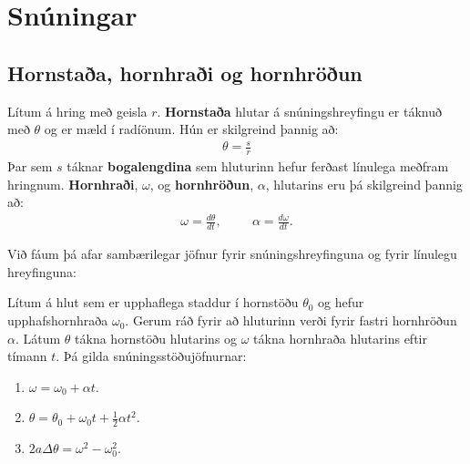 
\chapter{Snúningar}

\section{Hornstaða, hornhraði og hornhröðun}


\begin{tcolorbox}
\begin{definition} \label{def:hornstada}
Lítum á hring með geisla $r$. \textbf{Hornstaða} hlutar á snúningshreyfingu er táknuð með $\theta$ og er mæld í radíönum. Hún er skilgreind þannig að:
\begin{align*}
    \theta = \frac{s}{r}
\end{align*}
Þar sem $s$ táknar \textbf{bogalengdina} sem hluturinn hefur ferðast línulega meðfram hringnum. \textbf{Hornhraði}, $\omega$, og \textbf{hornhröðun}, $\alpha$, hlutarins eru þá skilgreind þannig að:
\begin{align*}
    \omega = \frac{d\theta}{dt}, \hspace{1cm} \alpha = \frac{d\omega}{dt}.
\end{align*}
\end{definition}
\end{tcolorbox}

Við fáum þá afar sambærilegar jöfnur fyrir snúningshreyfinguna og fyrir línulegu hreyfinguna:


\begin{tcolorbox}
\begin{theorem}
Lítum á hlut sem er upphaflega staddur í hornstöðu $\theta_0$ og hefur upphafshornhraða $\omega_0$. Gerum ráð fyrir að hluturinn verði fyrir fastri hornhröðun $\alpha$. Látum $\theta$ tákna hornstöðu hlutarins og $\omega$ tákna hornhraða hlutarins eftir tímann $t$. Þá gilda snúningsstöðujöfnurnar:

\begin{enumerate}[label = \textbf{(\roman*)}]
    \item $\omega = \omega_0 + \alpha t$.

    \item $\theta = \theta_0 + \omega_0 t + \frac{1}{2}\alpha t^2$.
    
    \item $2a \Delta \theta = \omega^2 - \omega_0^2$.
\end{enumerate}
\end{theorem}
\end{tcolorbox}

